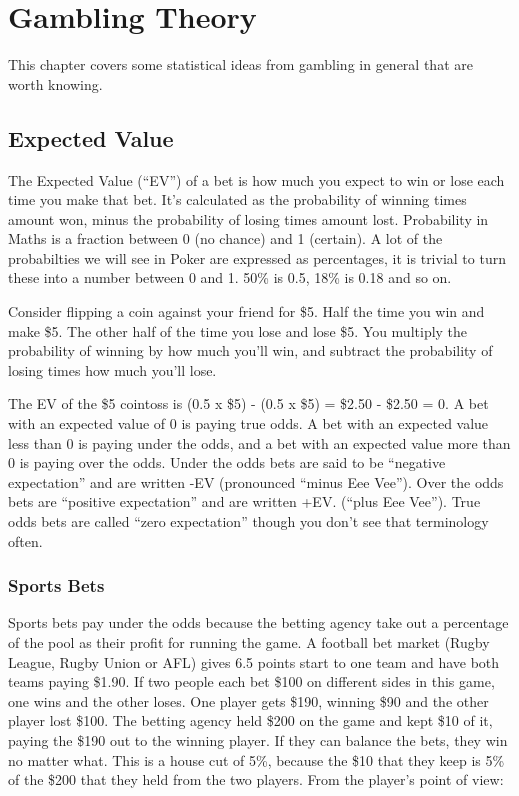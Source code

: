 \chapter{Gambling Theory}


This chapter covers some statistical ideas from gambling in general that
are worth knowing.

\section{Expected Value}

The Expected Value (``EV'') of a bet is how much you expect to win or lose
each time you make that bet. It's calculated as the probability of
winning times amount won, minus the probability of losing times amount
lost. Probability in Maths is a fraction between 0 (no chance)
and 1 (certain). A lot of the probabilties we will see in Poker
are expressed as percentages, it is trivial to turn these into a number
between 0 and 1. 50\% is 0.5, 18\% is 0.18 and so on.

Consider flipping a coin against your friend
for \$5. Half the time you win and make \$5. The other half of the
time you lose and lose \$5. You multiply the probability of winning
by how much you'll win, and subtract the probability of losing times
how much you'll lose.

The EV of the \$5 cointoss is (0.5 x \$5) - (0.5 x \$5)
= \$2.50 - \$2.50 = 0. A bet with an expected value of 0 is
paying true odds. A bet with an expected value less than 0 is
paying under the odds, and a bet with an expected value more than
0 is paying over the odds. Under the odds bets are said to be
``negative expectation'' and are written -EV (pronounced ``minus Eee Vee'').
Over the odds bets are ``positive expectation'' and are written +EV.
(``plus Eee Vee''). True odds bets are called ``zero expectation''
though you don't see that terminology often.

\subsection*{Sports Bets}
Sports bets pay under the odds because the betting agency take out a
percentage of the pool as their profit for running the game. A
football bet market (Rugby League, Rugby Union or AFL) gives 6.5
points start to one team and have both teams paying \$1.90. If two
people each bet \$100 on different sides in this game, one wins and
the other loses. One player gets \$190, winning \$90 and the other
player lost \$100. The betting agency held \$200 on the game and kept
\$10 of it, paying the \$190 out to the winning player. If they can
balance the bets, they win no matter what. This is a house cut of 5\%,
because the \$10 that they keep is 5\% of the \$200 that they held from
the two players. From the player's point of view:


